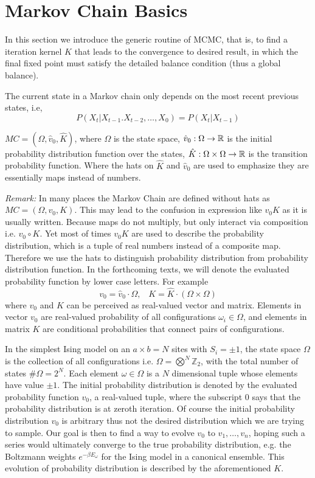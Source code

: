 \documentclass{article}
\begin{document}
\section{Markov Chain  Basics}
In this section we introduce the generic routine of MCMC, that is, to find a iteration kernel $K$ that leads to the convergence to desired result, in which the final fixed point must satisfy the detailed balance condition (thus a global balance).   

The current state in a Markov chain only depends on the most recent previous states, i.e,
$$P(X_t|X_{t-1}.X_{t-2},\dots,X_0)=P(X_t|X_{t-1})$$
\begin{definition} 
$MC=(\Omega, \hat{v}_0, \hat{K})$, where $\Omega$ is the state space, $\hat{v}_0:\Omega\to\mathbb{R}$ is the initial probability distribution function over the states, $\hat{K}:\Omega\times\Omega\to\mathbb{R}$ is the transition probability function. Where the hats on $\hat{K}$ and $\hat{v}_0$ are used to emphasize they are essentially maps instead of numbers. 
\end{definition}

\textit{Remark: }In many places the Markov Chain are defined without hats as $MC=(\Omega, v_0, K)$. This may lead to the confusion in expression like $v_0 K$ as it is usually written. Because maps do not multiply, but only interact via composition i.e. $v_0\circ K$. Yet most of times $v_0 K$ are used to describe the probability distribution, which is a tuple of real numbers instead of a composite map. Therefore we use the hats to distinguish probability distribution from probability distribution function. In the forthcoming texts, we will denote the evaluated probability function by lower case letters. For example
\[
v_0 = \hat{v}_0 \cdot \Omega, \;\; \; K = \hat{K} \cdot (\Omega \times \Omega)
\]
where $v_0$ and $K$ can be perceived as real-valued vector and matrix.  Elements in vector $v_0$ are real-valued probability of all configurations $\omega_i \in \Omega$, and elements in matrix $K$ are conditional probabilities that connect pairs of configurations.   


\begin{example}
In the simplest Ising model on an $a \times b = N$ sites with $S_i = \pm 1$, the state space $\Omega$ is the collection of all configurations i.e. $\Omega =  \bigotimes^{N} \mathbb{Z}_2$, with the total number of states $\#\Omega = 2^{N}$. Each element $\omega \in \Omega$ is a $N$ dimensional tuple whose elements have value $\pm 1$. The initial probability distribution is denoted by the evaluated probability function $v_0$, a real-valued tuple, where the subscript $0$ says that the probability distribution is at zeroth iteration. Of course the initial probability distribution $v_0$ is arbitrary thus not the desired distribution which we are trying to sample. Our goal is then to find a way to evolve $v_0$ to $v_1, \ldots, v_n$, hoping such a series would ultimately converge to the true probability distribution, e.g. the Boltzmann weights $e^{-\beta E_{\omega}}$ for the Ising model in a canonical ensemble. This evolution of probability distribution is described by the aforementioned $K$.
\end{example}
\end{document}
